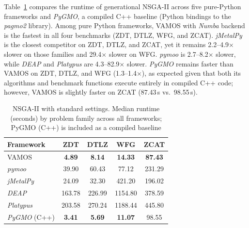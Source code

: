 \documentclass[journal]{IEEEtran}
\newcommand{\VAMOS}{VAMOS}
\begin{document}
Table~\ref{tab:frameworks_perf} compares the runtime of generational NSGA-II across five pure-Python frameworks and \textit{PyGMO}, a compiled C++ baseline (Python bindings to the \textit{pagmo2} library). Among pure Python frameworks, \VAMOS{} with \textit{Numba} backend is the fastest in all four benchmarks (ZDT, DTLZ, WFG, and ZCAT). \textit{jMetalPy} is the closest competitor on ZDT, DTLZ, and ZCAT, yet it remains 2.2--4.9$\times$ slower on those families and 29.4$\times$ slower on WFG. \textit{pymoo} is 2.7--8.2$\times$ slower, while \textit{DEAP} and \textit{Platypus} are 4.3--82.9$\times$ slower. \textit{PyGMO} remains faster than \VAMOS{} on ZDT, DTLZ, and WFG (1.3--1.4$\times$), as expected given that both its algorithms and benchmark functions execute entirely in compiled C++ code; however, \VAMOS{} is slightly faster on ZCAT (87.43\,s vs.\ 98.55\,s).

\begin{table}[htbp]
\centering
\caption{NSGA-II with standard settings. Median runtime (seconds) by problem family across all frameworks; PyGMO (C++) is included as a compiled baseline}
\label{tab:frameworks_perf}
\begin{tabular}{lcccc}
\toprule
\textbf{Framework} & \textbf{ZDT} & \textbf{DTLZ} & \textbf{WFG} & \textbf{ZCAT} \\
\midrule
VAMOS & \textbf{4.89} & \textbf{8.14} & \textbf{14.33} & \textbf{87.43} \\
\textit{pymoo} & 39.90 & 60.43 & 77.12 & 231.29 \\
\textit{jMetalPy} & 24.09 & 32.30 & 421.20 & 196.02 \\
\textit{DEAP} & 163.78 & 226.99 & 1154.80 & 378.59 \\
\textit{Platypus} & 203.58 & 270.24 & 1188.44 & 445.80 \\
\midrule
\textit{PyGMO} (C++) & \textbf{3.41} & \textbf{5.69} & \textbf{11.07} & 98.55 \\
\bottomrule
\end{tabular}
\end{table}
\end{document}
